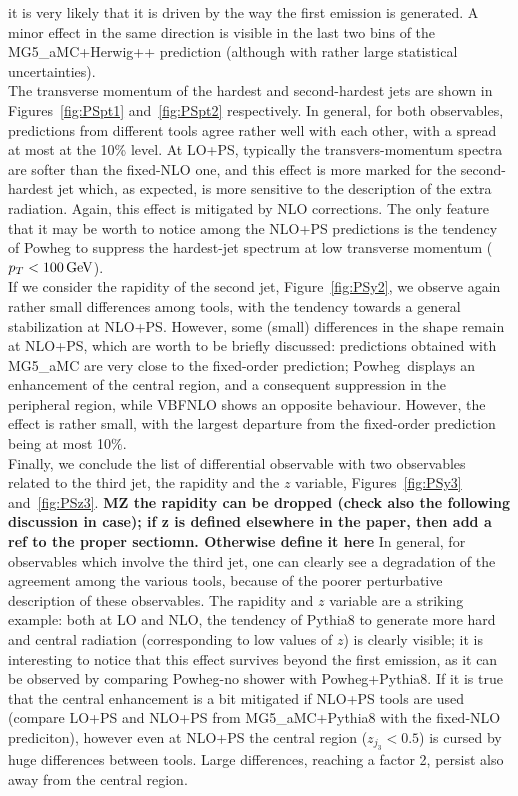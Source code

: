 it is very likely that it is driven by the way the first emission is generated. A minor effect in the same direction is visible in the last two bins of the 
{\sc MG5\_aMC+Herwig++} prediction (although with rather large statistical uncertainties).\\
The transverse momentum of the hardest and second-hardest jets are shown in Figures~\ref{fig:PSpt1} and~\ref{fig:PSpt2} respectively. In general, for both observables, 
predictions from different tools agree rather well with each other, with a spread at most at the 10\% level. At LO+PS, typically the transvers-momentum spectra are softer than
the fixed-NLO one, and this effect is more marked for the second-hardest jet which, as expected, is more sensitive to the description of the extra radiation. Again, this
effect is mitigated by NLO corrections. The only feature that it may be worth to notice among the NLO+PS predictions is the tendency of {\sc Powheg} to suppress the
hardest-jet spectrum at low transverse momentum ($p_T<100 \,\text{GeV}$).\\
If we consider the rapidity of the second jet, Figure~\ref{fig:PSy2}, we observe again rather small differences among tools, with the tendency towards a general 
stabilization at NLO+PS. However, some (small) differences in the shape remain at NLO+PS, which are worth to be briefly discussed: predictions 
obtained with {\sc MG5\_aMC} are very close to the fixed-order prediction; {\sc Powheg}\ displays an enhancement of the central region, and a consequent suppression in the
peripheral region, while {\sc VBFNLO} shows an opposite behaviour. However, the effect is rather small, with the largest departure from the fixed-order prediction being 
at most 10\%.\\
Finally, we conclude the list of differential observable with two observables related to the third jet, the rapidity and the $z$ variable, Figures~\ref{fig:PSy3} and~\ref{fig:PSz3}. 
{\bf MZ the rapidity can be dropped (check also the following discussion in case); if z is defined elsewhere in the paper, then add a ref to the proper sectiomn. Otherwise define it here} 
In general, for observables which involve the third jet, one 
can clearly see a degradation of the agreement among the various tools, because of the poorer perturbative description of these observables. The rapidity and $z$ variable
are a striking example: both at LO and NLO, the tendency of {\sc Pythia8} to generate more hard and central radiation (corresponding to low values of $z$) 
is clearly visible; it is interesting to notice that
this effect survives beyond the first emission, as it can be observed by comparing {\sc Powheg-no shower} with {\sc Powheg+Pythia8}. If it is true that the central enhancement
is a bit mitigated if NLO+PS tools are used (compare LO+PS and NLO+PS from {\sc MG5\_aMC+Pythia8} with the fixed-NLO prediciton), however even at NLO+PS the central region 
($z_{j_3}<0.5$) is cursed by huge differences between tools. Large differences, reaching a factor 2, persist also away from the central region. \\

